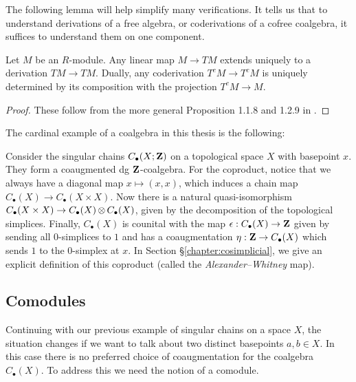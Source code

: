 The following lemma will help simplify many verifications. It tells us that to understand derivations of a free algebra, or coderivations of a cofree coalgebra, it suffices to understand them on one component. 
\begin{lem}\label{lem:maps_extend}
    Let $M$ be an $R$-module. Any linear map $M \to TM$ extends uniquely to a derivation $TM\to TM$. Dually, any coderivation $T^cM \to T^cM$ is uniquely determined by its composition with the projection $T^cM\to M$. 
    \begin{proof}
        These follow from the more general Proposition 1.1.8 and 1.2.9 in \cite{Loday2012}.
    \end{proof} 
\end{lem}
The cardinal example of a coalgebra in this thesis is the following:
\begin{exmp}
Consider the singular chains $C_\bullet(X; \mathbf{Z})$ on a topological space $X$ with basepoint $x$. They form a coaugmented dg $\mathbf{Z}$-coalgebra. For the coproduct, notice that we always have a diagonal map $x \mapsto (x,x)$, which induces a chain map $C_\bullet(X) \to C_\bullet(X\times X)$. Now there is a natural quasi-isomorphism $C_\bullet(X\times X) \to C_\bullet(X)\operatorname{\otimes} C_\bullet(X)$, given by the decomposition of the topological simplices. Finally, $C_\bullet(X)$ is counital with the map $\epsilon: C_\bullet(X) \to \mathbf{Z}$ given by sending all 0-simplices to $1$ and has a coaugmentation $\eta: \mathbf{Z}\to C_\bullet(X)$ which sends $1$ to the 0-simplex at $x$. In Section \S\ref{chapter:cosimplicial}, we give an explicit definition of this coproduct (called the \emph{Alexander--Whitney} map).
\end{exmp}

\subsection{Comodules} Continuing with our previous example of singular chains on a space $X$, the situation changes if we want to talk about two distinct basepoints $a, b \in X$. In this case there is no preferred choice of coaugmentation for the coalgebra $C_\bullet(X)$. To address this we need the notion of a comodule.

